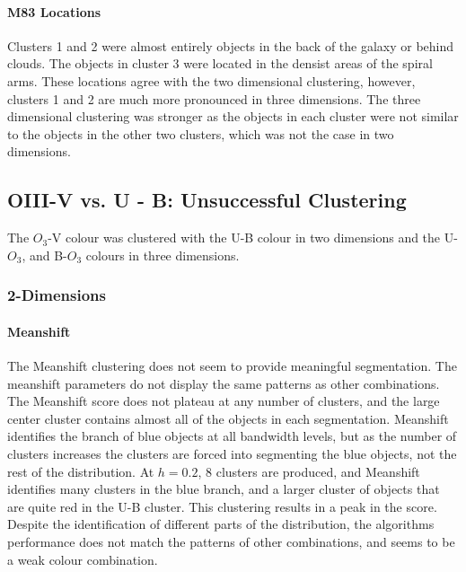 \paragraph{M83 Locations}
Clusters 1 and 2 were almost entirely objects in the back of the galaxy or behind clouds.
The objects in cluster 3 were located in the densist areas of the spiral arms.
These locations agree with the two dimensional clustering, however, clusters 1 and 2 are much more pronounced in three dimensions.
The three dimensional clustering was stronger as the objects in each cluster were not similar to the objects in the other two clusters, which was not the case in two dimensions.

\subsection{OIII-V vs. U - B: Unsuccessful Clustering}
The $O_{3}$-V colour was clustered with the U-B colour in two dimensions and the U-$O_{3}$, and B-$O_{3}$ colours in three dimensions.

\subsubsection{2-Dimensions}

\paragraph{Meanshift}
The Meanshift clustering does not seem to provide meaningful segmentation. The meanshift parameters do not display the same patterns as other combinations. 
The Meanshift score does not plateau at any number of clusters, and the large center cluster contains almost all of the objects in each segmentation.
Meanshift identifies the branch of blue objects at all bandwidth levels, but as the number of clusters increases the clusters are forced into segmenting the blue objects, not the rest of the distribution.
At $h=0.2$, 8 clusters are produced, and Meanshift identifies many clusters in the blue branch, and a larger cluster of objects that are quite red in the U-B cluster.
This clustering results in a peak in the score.
Despite the identification of different parts of the distribution, the algorithms performance does not match the patterns of other combinations, and seems to be a weak colour combination. 

